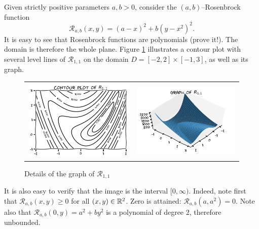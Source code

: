 \begin{example}\label{example:Rosenbrock}
Given strictly positive parameters $a,b > 0$, consider the $(a,b)$--Rosenbrock function 
\begin{equation*} 
\mathcal{R}_{a,b}(x, y) = (a-x)^2 + b(y-x^2)^2.
\end{equation*}
It is easy to see that Rosenbrock functions are polynomials (prove it!).  The domain is therefore the whole plane. Figure \ref{figure:Rosenbrock} illustrates a contour plot with several level lines of $\mathcal{R}_{1,1}$ on the domain $D = [-2,2] \times [-1,3]$, as well as its graph.

\begin{figure}[ht!]
\begin{tabular}{cc}
\includegraphics[width=0.5\linewidth]{rosenbrockContour} &
\includegraphics[width=0.5\linewidth]{rosenbrockGraph}
\end{tabular}
\caption{Details of the graph of $\mathcal{R}_{1,1}$}
\label{figure:Rosenbrock}
\end{figure}
It is also easy to verify that the image is the interval $[0,\infty)$.  Indeed, note first that $\mathcal{R}_{a,b}(x,y) \geq 0$ for all $(x,y) \in \mathbb{R}^2$.  Zero is attained: $\mathcal{R}_{a,b} (a,a^2) = 0$.  Note also that $\mathcal{R}_{a,b}(0,y) = a^2 + by^2$ is a polynomial of degree 2, therefore unbounded.


\end{example}

